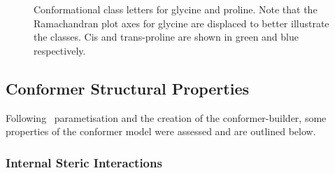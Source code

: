 \begin{figure}[hbtp]
\begin{center}
\end{center}
\caption[Conformational class letters for glycine and proline]
{Conformational class letters for glycine and proline. Note that the Ramachandran plot axes for glycine are displaced to better illustrate the classes. Cis and trans-proline are shown in green and blue respectively.}
\label{fig:reduced_rep:conformer_id_glypro}
\end{figure}

\subsection{Conformer Structural Properties}

Following \angleset\ parametisation and the creation of the conformer-builder, some properties of the conformer model were assessed and are outlined below.

\subsubsection{Internal Steric Interactions}

